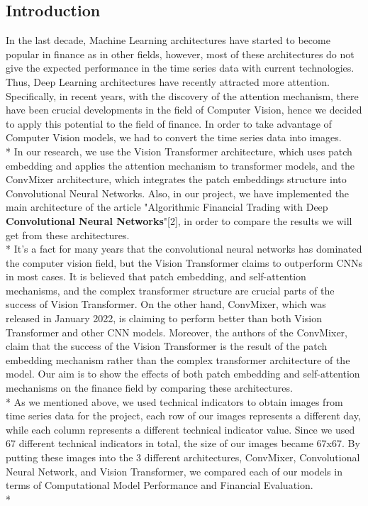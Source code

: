 \documentclass{article}
\begin{document}
\begin{center}
    \section{Introduction}
\end{center}
In the last decade, Machine Learning architectures have started to become popular in finance as in other fields, however, most of these architectures do not give the expected performance in the time series data with current technologies. Thus, Deep Learning architectures have recently attracted more attention. Specifically, in recent years, with the discovery of the attention mechanism, there have been crucial developments in the field of Computer Vision, hence we decided to apply this potential to the field of finance. In order to take advantage of Computer Vision models, we had to convert the time series data into images. \vspace{0.0005cm} \\*
In our research, we use the Vision Transformer architecture, which uses patch embedding and applies the attention mechanism to transformer models, and the ConvMixer architecture, which integrates the patch embeddings structure into Convolutional Neural Networks. Also, in our project, we have implemented the main architecture of the article "Algorithmic Financial Trading with Deep \textbf{Convolutional Neural Networks}"[2], in order to compare the results we will get from these architectures. \vspace{0.2cm} \\*
It's a fact for many years that the convolutional neural networks has dominated the computer vision field, but the Vision Transformer claims to outperform CNNs in most cases. It is believed that patch embedding, and self-attention mechanisms, and the complex transformer structure are crucial parts of the success of Vision Transformer. On the other hand, ConvMixer, which was released in January 2022, is claiming to perform better than both Vision Transformer and other CNN models. Moreover, the authors of the ConvMixer, claim that the success of the Vision Transformer is the result of the patch embedding mechanism rather than the complex transformer architecture of the model. Our aim is to show the effects of both patch embedding and self-attention mechanisms on the finance field by comparing these architectures. \vspace{0.2cm} \\*
As we mentioned above, we used technical indicators to obtain images from time series data for the project, each row of our images represents a different day, while each column represents a different technical indicator value. Since we used 67 different technical indicators in total, the size of our images became 67x67. By putting these images into the 3 different architectures, ConvMixer, Convolutional Neural Network, and Vision Transformer, we compared each of our models in terms of Computational Model Performance and Financial Evaluation. \vspace{0.2cm} \\*
\end{document}
